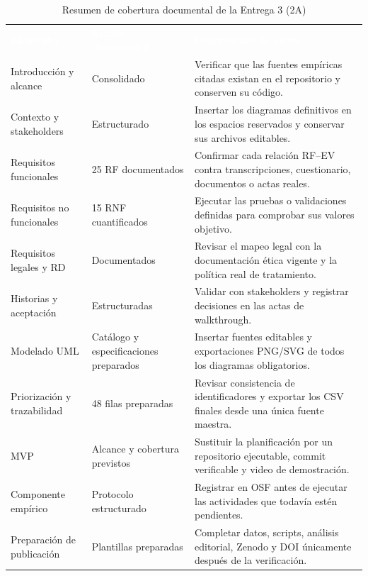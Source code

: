 \documentclass[12pt,a4paper]{article}
\begin{document}
\begin{table}[H]
\centering
\caption{Resumen de cobertura documental de la Entrega 3 (2A)}
\label{tab:resumen-cobertura-ers}
\small
{}
\begin{tabularx}{\textwidth}{L{4.1cm} L{2.75cm} Y}
\textcolor{white}{\textbf{Elemento}} &
\textcolor{white}{\textbf{Estado documental}} &
\textcolor{white}{\textbf{Observación de cierre}}\\
Introducción y alcance & Consolidado & Verificar que las fuentes empíricas citadas existan en el repositorio y conserven su código.\\
Contexto y stakeholders & Estructurado & Insertar los diagramas definitivos en los espacios reservados y conservar sus archivos editables.\\
Requisitos funcionales & 25 RF documentados & Confirmar cada relación RF--EV contra transcripciones, cuestionario, documentos o actas reales.\\
Requisitos no funcionales & 15 RNF cuantificados & Ejecutar las pruebas o validaciones definidas para comprobar sus valores objetivo.\\
Requisitos legales y RD & Documentados & Revisar el mapeo legal con la documentación ética vigente y la política real de tratamiento.\\
Historias y aceptación & Estructuradas & Validar con stakeholders y registrar decisiones en las actas de walkthrough.\\
Modelado UML & Catálogo y especificaciones preparados & Insertar fuentes editables y exportaciones PNG/SVG de todos los diagramas obligatorios.\\
Priorización y trazabilidad & 48 filas preparadas & Revisar consistencia de identificadores y exportar los CSV finales desde una única fuente maestra.\\
MVP & Alcance y cobertura previstos & Sustituir la planificación por un repositorio ejecutable, commit verificable y video de demostración.\\
Componente empírico & Protocolo estructurado & Registrar en OSF antes de ejecutar las actividades que todavía estén pendientes.\\
Preparación de publicación & Plantillas preparadas & Completar datos, scripts, análisis editorial, Zenodo y DOI únicamente después de la verificación.\\
\end{tabularx}
\end{table}
\end{document}
